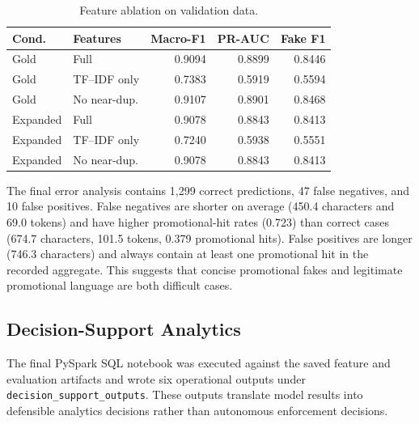\documentclass[conference]{IEEEtran}
\begin{document}
\begin{table}[t]
\caption{Feature ablation on validation data.}
\label{tab:ablation}
\centering\scriptsize
\begin{tabular}{llrrr}
\toprule
Cond. & Features & Macro-F1 & PR-AUC & Fake F1\\
\midrule
Gold & Full & 0.9094 & 0.8899 & 0.8446\\
Gold & TF--IDF only & 0.7383 & 0.5919 & 0.5594\\
Gold & No near-dup. & 0.9107 & 0.8901 & 0.8468\\
Expanded & Full & 0.9078 & 0.8843 & 0.8413\\
Expanded & TF--IDF only & 0.7240 & 0.5938 & 0.5551\\
Expanded & No near-dup. & 0.9078 & 0.8843 & 0.8413\\
\bottomrule
\end{tabular}
\end{table}

The final error analysis contains 1,299 correct predictions, 47 false negatives, and 10 false positives. False negatives are shorter on average (450.4 characters and 69.0 tokens) and have higher promotional-hit rates (0.723) than correct cases (674.7 characters, 101.5 tokens, 0.379 promotional hits). False positives are longer (746.3 characters) and always contain at least one promotional hit in the recorded aggregate. This suggests that concise promotional fakes and legitimate promotional language are both difficult cases.

\subsection{Decision-Support Analytics}
The final PySpark SQL notebook was executed against the saved feature and evaluation artifacts and wrote six operational outputs under \texttt{decision\_support\_outputs}. These outputs translate model results into defensible analytics decisions rather than autonomous enforcement decisions.
\end{document}
